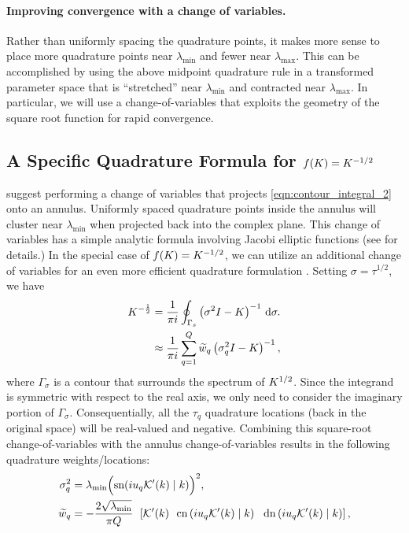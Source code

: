 \paragraph{Improving convergence with a change of variables.}
Rather than uniformly spacing the quadrature points, it makes more sense to place more quadrature points near $\lambda_\text{min}$ and fewer near $\lambda_\text{max}$.
This can be accomplished by using the above midpoint quadrature rule in a {transformed parameter space} that is ``stretched'' near $\lambda_\text{min}$ and contracted near $\lambda_\text{max}$.
In particular, we will use a change-of-variables that exploits the geometry of the square root function for rapid convergence.

\subsection{A Specific Quadrature Formula for $f(K) = K^{-1/2}$}
\citet{hale2008computing} suggest performing a change of variables that projects \cref{eqn:contour_integral_2} onto an annulus.
Uniformly spaced quadrature points inside the annulus will cluster near $\lambda_\text{min}$ when projected back into the complex plane.
This change of variables has a simple analytic formula involving Jacobi elliptic functions (see \citep[][Sec. 2]{hale2008computing} for details.)
In the special case of $f(K) = K^{-1/2}$, we can utilize an additional change of variables for an even more efficient quadrature formulation \citep[][Sec. 4]{hale2008computing}.
Setting $\sigma = \tau^{1/2}$, we have
%
\begin{align}
	K^{-\frac 1 2}
  &= \frac{1}{\pi i} \oint_{\Gamma_s} \left( \sigma^2 I - K \right)^{-1} \,\mathrm{d}{\sigma}.
  \nonumber
  \\
  &\approx
  \frac{1}{\pi i} \sum_{q=1}^Q \widetilde w_q \left( \sigma_q^2 I - K \right)^{-1},
  \label{eqn:contour_integral_quad_3}
\end{align}
%
where $\Gamma_\sigma$ is a contour that surrounds the spectrum of $K^{1/2}$.
Since the integrand is symmetric with respect to the real axis, we only need to consider the imaginary portion of $\Gamma_\sigma$.
Consequentially, all the $\tau_q$ quadrature locations (back in the original space) will be real-valued and negative.
Combining this square-root change-of-variables with the annulus change-of-variables results in the following quadrature weights/locations:
%
\begin{equation}
  \begin{split}
    \sigma_q^2
    &= \lambda_\text{min} \Bigl( \text{sn}(i u_q \mathcal{K}'(k) \mid k) \Bigr)^2,
    \\
    \widetilde w_q
    &= -\frac{ 2 \sqrt{\lambda_\text{min}} }{ \pi Q }
    \:\: \left[
    \mathcal{K}'( k )
    \:\:\: \text{cn} \left( i u_q \mathcal{K}'(k) \mid k \right)
    \:\:\: \text{dn} \left( i u_q \mathcal{K}'(k) \mid k \right)
    \right],
  \end{split}
  \label{eqn:quad_points_and_locations}
\end{equation}
